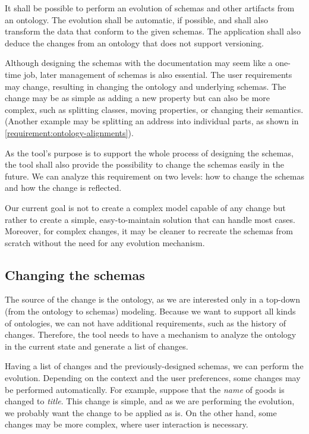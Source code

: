 \begin{requirement}
    It shall be possible to perform an evolution of schemas and other artifacts from an ontology. The evolution shall be automatic, if possible, and shall also transform the data that conform to the given schemas. The application shall also deduce the changes from an ontology that does not support versioning.
    \label{requirement:evolution}
\end{requirement}

Although designing the schemas with the documentation may seem like a one-time job, later management of schemas is also essential. The user requirements may change, resulting in changing the ontology and underlying schemas. The change may be as simple as adding a new property but can also be more complex, such as splitting classes, moving properties, or changing their semantics. (Another example may be splitting an address into individual parts, as shown in \autoref{requirement:ontology-alignments}).

As the tool's purpose is to support the whole process of designing the schemas, the tool shall also provide the possibility to change the schemas easily in the future. We can analyze this requirement on two levels: how to change the schemas and how the change is reflected.

Our current goal is not to create a complex model capable of any change but rather to create a simple, easy-to-maintain solution that can handle most cases. Moreover, for complex changes, it may be cleaner to recreate the schemas from scratch without the need for any evolution mechanism.

\subsection*{Changing the schemas}

The source of the change is the ontology, as we are interested only in a top-down (from the ontology to schemas) modeling. Because we want to support all kinds of ontologies, we can not have additional requirements, such as the history of changes. Therefore, the tool needs to have a mechanism to analyze the ontology in the current state and generate a list of changes.

Having a list of changes and the previously-designed schemas, we can perform the evolution. Depending on the context and the user preferences, some changes may be performed automatically. For example, suppose that the \textit{name} of goods is changed to \textit{title}. This change is simple, and as we are performing the evolution, we probably want the change to be applied as is. On the other hand, some changes may be more complex, where user interaction is necessary.

